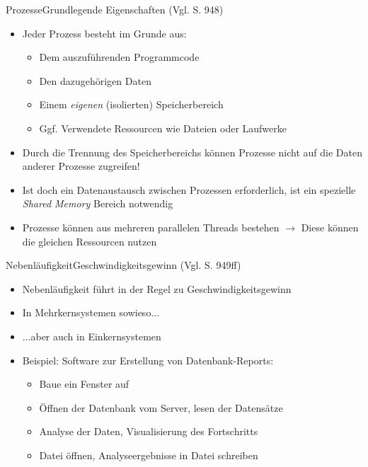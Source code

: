 \begin{frame}{Prozesse}{Grundlegende Eigenschaften (Vgl. \cite{ullenboom2018java} S. 948)}
    \begin{itemize}
        \item Jeder Prozess besteht im Grunde aus:
        \begin{itemize}
            \item Dem auszuführenden Programmcode
            \item Den dazugehörigen Daten
            \item Einem \textit{eigenen} (isolierten) Speicherbereich
            \item Ggf. Verwendete Ressourcen wie Dateien oder Laufwerke
        \end{itemize}
        \item Durch die Trennung des Speicherbereichs können Prozesse nicht auf die Daten anderer Prozesse zugreifen!
        \item Ist doch ein Datenaustausch zwischen Prozessen erforderlich, ist ein spezielle \textit{Shared Memory} Bereich notwendig
        \item Prozesse können aus mehreren parallelen Threads bestehen $\rightarrow$ Diese können die gleichen Ressourcen nutzen
    \end{itemize}
\end{frame}

\begin{frame}{Nebenläufigkeit}{Geschwindigkeitsgewinn (Vgl. \cite{ullenboom2018java} S. 949ff)}
    \begin{itemize}
        \item Nebenläufigkeit führt in der Regel zu Geschwindigkeitsgewinn
        \item In Mehrkernsystemen sowieso...
        \item ...aber auch in Einkernsystemen
        \item Beispiel: Software zur Erstellung von Datenbank-Reports:
        \begin{itemize}
            \item Baue ein Fenster auf
            \item Öffnen der Datenbank vom Server, lesen der Datensätze
            \item Analyse der Daten, Visualisierung des Fortschritts
            \item Datei öffnen, Analyseergebnisse in Datei schreiben
        \end{itemize}
    \end{itemize}
\end{frame}

